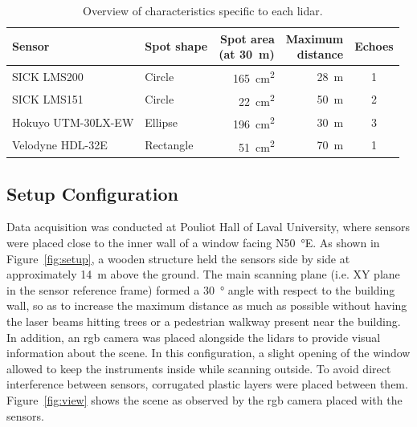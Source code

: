 \begin{table}
    \centering
    \begin{tabular}{@{}llrrc@{}}
        \toprule
        \textbf{Sensor} & \textbf{Spot shape} & \makecell[cc]{\textbf{Spot area} \\ (at \SI{30}{\meter})} & \makecell[cc]{\textbf{Maximum} \\ \textbf{distance}} & \textbf{Echoes} \\
        \hline
        SICK LMS200         & Circle    & \SI{165}{\centi\meter\squared} & \SI{28}{\meter} & 1 \\
        SICK LMS151         & Circle    & \SI{22}{\centi\meter\squared}  & \SI{50}{\meter} & 2 \\
        Hokuyo UTM-30LX-EW  & Ellipse   & \SI{196}{\centi\meter\squared} & \SI{30}{\meter} & 3 \\
        Velodyne HDL-32E    & Rectangle & \SI{51}{\centi\meter\squared}  & \SI{70}{\meter} & 1 \\
        \bottomrule
    \end{tabular}
    \caption[Overview of characteristics specific to each \gls*{lidar}.]{Overview of characteristics specific to each \gls*{lidar}.}
    \label{tab:lidars}
\end{table}

\subsection{Setup Configuration}

Data acquisition was conducted at Pouliot Hall of Laval University, where sensors were placed close to the inner wall of a window facing N\SI{50}{\degree}E. As shown in Figure~\ref{fig:setup}, a wooden structure held the sensors side by side at approximately \SI{14}{\meter} above the ground. The main scanning plane (i.e. XY plane in the sensor reference frame) formed a \SI{30}{\degree} angle with respect to the building wall, so as to increase the maximum distance as much as possible without having the laser beams hitting  trees or a pedestrian walkway present near the building. In addition, an \gls*{rgb} camera was placed alongside the \gls*{lidar}s to provide visual information about the scene. In this configuration, a slight opening of the window allowed to keep the instruments inside while scanning outside. To avoid direct interference between sensors, corrugated plastic layers were placed between them. Figure~\ref{fig:view} shows the scene as observed by the \gls*{rgb} camera placed with the sensors.

